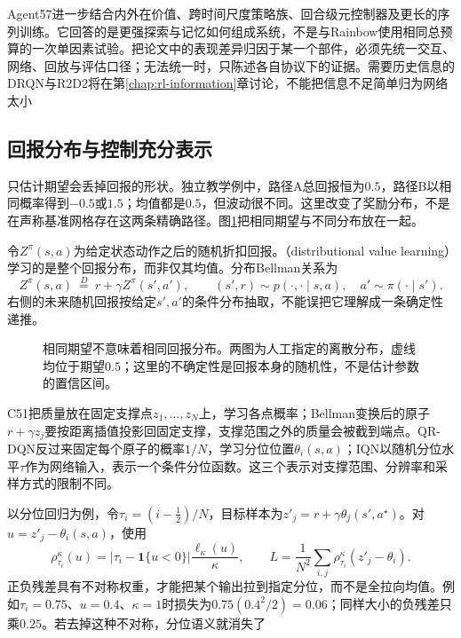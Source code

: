 Agent57进一步结合内外在价值、跨时间尺度策略族、回合级元控制器及更长的序列训练。它回答的是更强探索与记忆如何组成系统，不是与Rainbow使用相同总预算的一次单因素试验。把论文中的表现差异归因于某一个部件，必须先统一交互、网络、回放与评估口径；无法统一时，只陈述各自协议下的证据。需要历史信息的DRQN与R2D2将在第\ref{chap:rl-information}章讨论，不能把信息不足简单归为网络太小

\subsection{回报分布与控制充分表示}
\label{sec:rl-learning-distributional}

只估计期望会丢掉回报的形状。独立教学例中，路径A总回报恒为$0.5$，路径B以相同概率得到$-0.5$或$1.5$；均值都是$0.5$，但波动很不同。这里改变了奖励分布，不是在声称基准网格存在这两条精确路径。图\ref{fig:rl-learning-return-distributions}把相同期望与不同分布放在一起。

令$Z^\pi(s,a)$为给定状态动作之后的随机折扣回报。（distributional value learning）学习的是整个回报分布，而非仅其均值。分布Bellman关系为
\begin{equation}
  Z^\pi(s,a)\ \overset{D}{=}\ %
    r+\gamma Z^\pi(s',a'),\qquad
  (s',r)\sim p(\cdot,\cdot\mid s,a),\quad a'\sim\pi(\cdot\mid s').
  \label{eq:rl-learning-distributional-bellman}
\end{equation}
右侧的未来随机回报按给定$s',a'$的条件分布抽取，不能误把它理解成一条确定性递推。

\begin{figure}[htbp]
  \centering
  
  \caption{相同期望不意味着相同回报分布。两图为人工指定的离散分布，虚线均位于期望$0.5$；这里的不确定性是回报本身的随机性，不是估计参数的置信区间。}
  \label{fig:rl-learning-return-distributions}
\end{figure}

C51把质量放在固定支撑点$z_1,\ldots,z_N$上，学习各点概率；Bellman变换后的原子$r+\gamma z_j$要按距离插值投影回固定支撑，支撑范围之外的质量会被截到端点。QR-DQN反过来固定每个原子的概率$1/N$，学习分位位置$\theta_i(s,a)$；IQN以随机分位水平$\tau$作为网络输入，表示一个条件分位函数。这三个表示对支撑范围、分辨率和采样方式的限制不同。

以分位回归为例，令$\tau_i=(i-\tfrac12)/N$，目标样本为$z'_j=r+\gamma\theta_j(s',a^\star)$。对$u=z'_j-\theta_i(s,a)$，使用
\[
  \rho_{\tau_i}^{\kappa}(u)
      =|\tau_i-\mathbf1\{u<0\}|\frac{\ell_\kappa(u)}{\kappa},
  \qquad
  L=\frac1{N^2}\sum_{i,j}\rho_{\tau_i}^{\kappa}(z'_j-\theta_i).
\]
正负残差具有不对称权重，才能把某个输出拉到指定分位，而不是全拉向均值。例如$\tau_i=0.75$、$u=0.4$、$\kappa=1$时损失为$0.75(0.4^2/2)=0.06$；同样大小的负残差只乘$0.25$。若去掉这种不对称，分位语义就消失了

